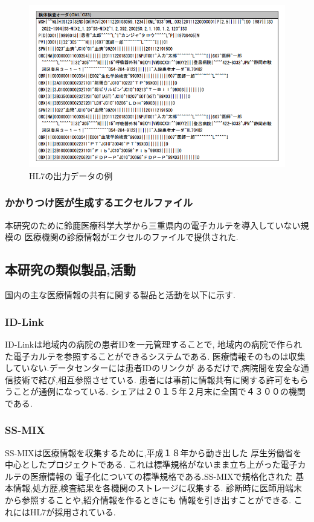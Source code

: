 	\begin{figure}[htbp]
    \begin{center}
			\includegraphics[width=12cm, bb=0 0 688 437, clip]{./gazou/ss-mix_sampledata.png}
    \end{center}
    \caption{HL7の出力データの例}
		\label{ss-mix_sampledata}
	\end{figure}



  \subsubsection{かかりつけ医が生成するエクセルファイル}
  本研究のために鈴鹿医療科学大学から三重県内の電子カルテを導入していない規模の
  医療機関の診療情報がエクセルのファイルで提供された.



\subsection{本研究の類似製品,活動}
  国内の主な医療情報の共有に関する製品と活動を以下に示す.



  \subsubsection{ID-Link}
    ID-Linkは地域内の病院の患者IDを一元管理することで,
    地域内の病院で作られた電子カルテを参照することができるシステムである.
    医療情報そのものは収集していない.データセンターには患者IDのリンクが
    あるだけで,病院間を安全な通信技術で結び,相互参照させている.
    患者には事前に情報共有に関する許可をもらうことが通例になっている.
    シェアは２０１５年２月末に全国で４３００の機関である.
    \cite{bibi12}

  \subsubsection{SS-MIX}
    SS-MIXは医療情報を収集するために,平成１８年から動き出した
    厚生労働省を中心としたプロジェクトである.
    これは標準規格がないまま立ち上がった電子カルテの医療情報の
    電子化についての標準規格である.SS-MIXで規格化された
    基本情報,処方歴,検査結果を各機関のストレージに収集する.
    診断時に医師用端末から参照することや,紹介情報を作るときにも
    情報を引き出すことができる.
    これにはHL7が採用されている.
    \cite{bibi7}

